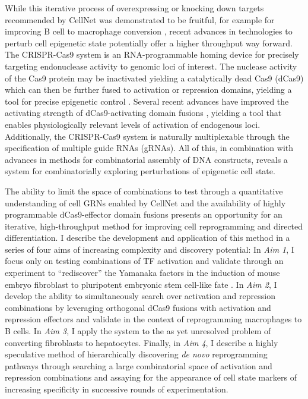 \documentclass[10pt]{article}
\begin{document}
While this iterative process of overexpressing or knocking down targets recommended by CellNet was demonstrated to be fruitful, for example for improving B cell to macrophage conversion \cite{morris2014dissecting}, recent advances in technologies to perturb cell epigenetic state potentially offer a higher throughput way forward. The CRISPR-Cas9 system is an RNA-programmable homing device for precisely targeting endonuclease activity to genomic loci of interest. The nuclease activity of the Cas9 protein may be inactivated yielding a catalytically dead Cas9 (dCas9) which can then be further fused to activation or repression domains, yielding a tool for precise epigenetic control \cite{qi2013repurposing}. Several recent advances have improved the activating strength of dCas9-activating domain fusions \cite{konermann2014genome, chavez2015VPR}, yielding a tool that enables physiologically relevant levels of activation of endogenous loci. Additionally, the CRISPR-Cas9 system is naturally multiplexable through the specification of multiple guide RNAs (gRNAs). All of this, in combination with advances in methods for combinatorial assembly of DNA constructs, reveals a system for combinatorially exploring perturbations of epigenetic cell state.

The ability to limit the space of combinations to test through a quantitative understanding of cell GRNs enabled by CellNet and the availability of highly programmable dCas9-effector domain fusions presents an opportunity for an iterative, high-throughput method for improving cell reprogramming and directed differentiation. I describe the development and application of this method in a series of four aims of increasing complexity and discovery potential: In \textit{Aim 1}, I focus only on testing combinations of TF activation and validate through an experiment to ``rediscover'' the Yamanaka factors in the induction of mouse embryo fibroblast to pluripotent embryonic stem cell-like fate \cite{takahashi2006induction}. In \textit{Aim 2}, I develop the ability to simultaneously search over activation and repression combinations by leveraging orthogonal dCas9 \cite{esvelt2013orthogonal} fusions with activation and repression effectors and validate in the context of reprogramming macrophages to B cells. In \textit{Aim 3}, I apply the system to the as yet unresolved problem of converting fibroblasts to hepatocytes. Finally, in \textit{Aim 4}, I describe a highly speculative method of hierarchically discovering \textit{de novo} reprogramming pathways through searching a large combinatorial space of activation and repression combinations and assaying for the appearance of cell state markers of increasing specificity in successive rounds of experimentation.
\end{document}
